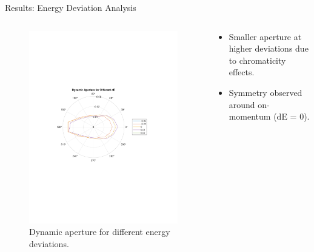 \documentclass{beamer}
\begin{document}
\begin{frame}{Results: Energy Deviation Analysis}
\begin{columns}
\begin{column}{0.5\textwidth}
    \begin{figure}
        \centering
        \includegraphics[width=1\linewidth]{da_sc_da_vs_de.pdf}
        \caption{Dynamic aperture for different energy deviations.}
    \end{figure}
\end{column}
\begin{column}{0.5\textwidth}
    \begin{itemize}
        \item Smaller aperture at higher deviations due to chromaticity effects.
        \item Symmetry observed around on-momentum (dE = 0).
    \end{itemize}
\end{column}
\end{columns}
\end{frame}
\end{document}
